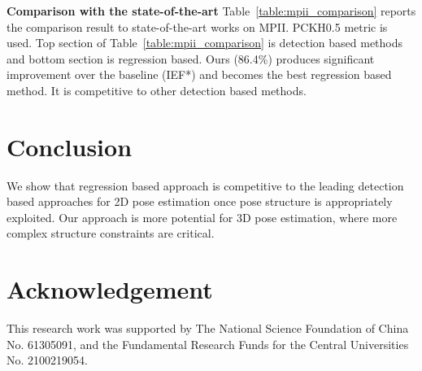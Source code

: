 \documentclass[10pt,twocolumn,letterpaper]{article}
\begin{document}
\textbf{Comparison with the state-of-the-art} Table~\ref{table:mpii_comparison} reports the comparison result to state-of-the-art works on MPII. PCKH0.5 metric is used. Top section of Table~\ref{table:mpii_comparison} is detection based methods and bottom section is regression based. Ours (86.4\%) produces significant improvement over the baseline (IEF*) and becomes the best regression based method. It is competitive to other detection based methods.

\section{Conclusion}
We show that regression based approach is competitive to the leading detection based approaches for 2D pose estimation once pose structure is appropriately exploited. Our approach is more potential for 3D pose estimation, where more complex structure constraints are critical.

\section*{Acknowledgement}
This research work was supported by The National Science Foundation of China No. 61305091, and the Fundamental Research Funds for the Central Universities No. 2100219054.


{\small


}
\end{document}
